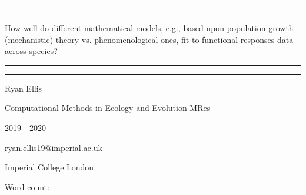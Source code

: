 \documentclass[11pt, a4paper]{article} %
\newcommand\wordcount{} %
\begin{document}
\begin{titlepage} %

	\centering %
	
	\vspace*{\baselineskip} %
	
	\rule{\textwidth}{1.6pt}\vspace*{-\baselineskip}\vspace*{2pt} %
	\rule{\textwidth}{0.4pt} %
	
	\vspace{0.75\baselineskip} %
	
	{\huge How well do different mathematical models, e.g., based upon population growth (mechanistic) theory vs. phenomenological ones, fit to functional responses data across species?} %
	
	\vspace{0.75\baselineskip} %
	
	\rule{\textwidth}{0.4pt}\vspace*{-\baselineskip}\vspace{3.2pt} %
	\rule{\textwidth}{1.6pt} %
		
	\vspace{2\baselineskip} %
	
	{\LARGE Ryan Ellis} %
	\vspace*{0.75\baselineskip} %
	
	\Large %
	Computational Methods in Ecology and Evolution MRes
	\vspace*{0.75\baselineskip} %
	
	2019 - 2020
	\vspace*{0.75\baselineskip} %

	ryan.ellis19@imperial.ac.uk
	\vspace*{3\baselineskip} %
	
	Imperial College London
	\vspace*{3\baselineskip} %
	
	Word count: \wordcount %
	
\end{titlepage}
\end{document}

